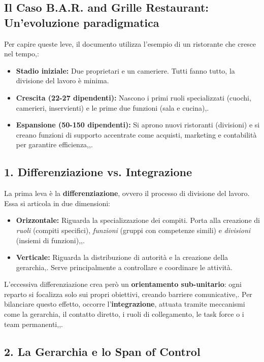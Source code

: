 \documentclass[a4paper,10pt]{article}
\begin{document}
\subsection*{Il Caso B.A.R. and Grille Restaurant: Un'evoluzione paradigmatica}

Per capire queste leve, il documento utilizza l'esempio di un ristorante che cresce nel tempo,:
\begin{itemize}
    \item \textbf{Stadio iniziale:} Due proprietari e un cameriere. Tutti fanno tutto, la divisione del lavoro è minima.
    \item \textbf{Crescita (22-27 dipendenti):} Nascono i primi ruoli specializzati (cuochi, camerieri, inservienti) e le prime due funzioni (sala e cucina),.
    \item \textbf{Espansione (50-150 dipendenti):} Si aprono nuovi ristoranti (divisioni) e si creano funzioni di supporto accentrate come acquisti, marketing e contabilità per garantire efficienza,,.
\end{itemize}

\subsection*{1. Differenziazione vs. Integrazione}

La prima leva è la \textbf{differenziazione}, ovvero il processo di divisione del lavoro. Essa si articola in due dimensioni:
\begin{itemize}
    \item \textbf{Orizzontale:} Riguarda la specializzazione dei compiti. Porta alla creazione di \textit{ruoli} (compiti specifici), \textit{funzioni} (gruppi con competenze simili) e \textit{divisioni} (insiemi di funzioni),,.
    \item \textbf{Verticale:} Riguarda la distribuzione di autorità e la creazione della gerarchia,. Serve principalmente a controllare e coordinare le attività.
\end{itemize}

L'eccessiva differenziazione crea però un \textbf{orientamento sub-unitario}: ogni reparto si focalizza solo sui propri obiettivi, creando barriere comunicative,. Per bilanciare questo effetto, occorre l'\textbf{integrazione}, attuata tramite meccanismi come la gerarchia, il contatto diretto, i ruoli di collegamento, le task force o i team permanenti,,.

\subsection*{2. La Gerarchia e lo Span of Control}
\end{document}
